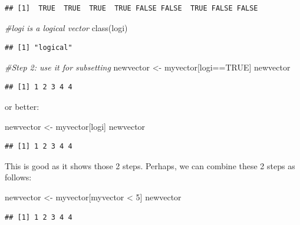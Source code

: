 \documentclass[
]{book}
\newenvironment{Shaded}{\begin{snugshade}}{\end{snugshade}}
\newcommand{\CommentTok}[1]{\textcolor[rgb]{0.56,0.35,0.01}{\textit{#1}}}
\newcommand{\ConstantTok}[1]{\textcolor[rgb]{0.00,0.00,0.00}{#1}}
\newcommand{\DecValTok}[1]{\textcolor[rgb]{0.00,0.00,0.81}{#1}}
\newcommand{\FunctionTok}[1]{\textcolor[rgb]{0.00,0.00,0.00}{#1}}
\newcommand{\NormalTok}[1]{#1}
\newcommand{\OtherTok}[1]{\textcolor[rgb]{0.56,0.35,0.01}{#1}}
\newcommand{\SpecialCharTok}[1]{\textcolor[rgb]{0.00,0.00,0.00}{#1}}
\begin{document}
\begin{verbatim}
## [1]  TRUE  TRUE  TRUE  TRUE FALSE FALSE  TRUE FALSE FALSE
\end{verbatim}

\begin{Shaded}
\begin{Highlighting}[]
\CommentTok{\#logi is a logical vector}
\FunctionTok{class}\NormalTok{(logi)}
\end{Highlighting}
\end{Shaded}

\begin{verbatim}
## [1] "logical"
\end{verbatim}

\begin{Shaded}
\begin{Highlighting}[]
\CommentTok{\#Step 2: use it for subsetting}
\NormalTok{newvector }\OtherTok{\textless{}{-}}\NormalTok{ myvector[logi}\SpecialCharTok{==}\ConstantTok{TRUE}\NormalTok{]}
\NormalTok{newvector}
\end{Highlighting}
\end{Shaded}

\begin{verbatim}
## [1] 1 2 3 4 4
\end{verbatim}

or better:

\begin{Shaded}
\begin{Highlighting}[]
\NormalTok{newvector }\OtherTok{\textless{}{-}}\NormalTok{ myvector[logi]}
\NormalTok{newvector}
\end{Highlighting}
\end{Shaded}

\begin{verbatim}
## [1] 1 2 3 4 4
\end{verbatim}

This is good as it shows those 2 steps. Perhaps, we can combine these 2 steps as follows:

\begin{Shaded}
\begin{Highlighting}[]
\NormalTok{newvector }\OtherTok{\textless{}{-}}\NormalTok{ myvector[myvector }\SpecialCharTok{\textless{}} \DecValTok{5}\NormalTok{]}
\NormalTok{newvector}
\end{Highlighting}
\end{Shaded}

\begin{verbatim}
## [1] 1 2 3 4 4
\end{verbatim}
\end{document}
